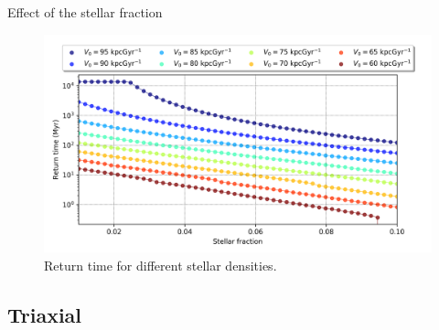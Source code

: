 \documentclass{beamer}
\begin{document}
\begin{frame}{Effect of the stellar fraction}
	\begin{figure}[h]
		\centering
		\includegraphics[width=0.9\linewidth]{"../Files/Week 7/Symmetric/returntimes_stellar_speed"}
		\caption{Return time for different stellar densities.}
	\end{figure}
\end{frame}

\subsection{Triaxial}
\end{document}

